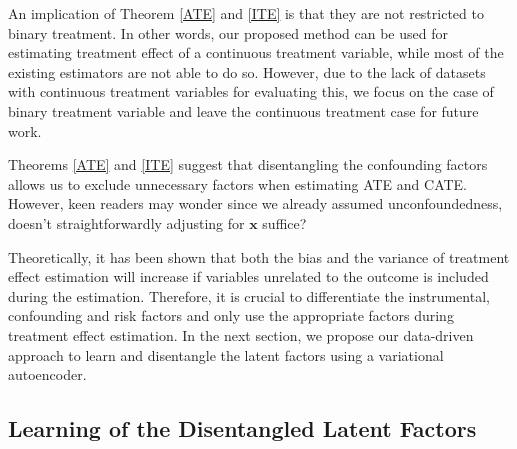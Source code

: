 \documentclass[letterpaper]{article} %
\newtheorem{theorem}{Theorem}
\begin{document}
An implication of Theorem \ref{ATE} and \ref{ITE} is that they are not restricted to binary treatment. In other words, our proposed method can be used for estimating treatment effect of a continuous treatment variable, while most of the existing estimators are not able to do so. However, due to the lack of datasets with continuous treatment variables for evaluating this, we focus on the case of binary treatment variable and leave the continuous treatment case for future work.

Theorems \ref{ATE} and \ref{ITE} suggest that disentangling the confounding factors allows us to exclude unnecessary factors when estimating ATE and CATE. However, keen readers may wonder since we already assumed unconfoundedness, doesn't straightforwardly adjusting for $\mathbf{x}$ suffice?

Theoretically, it has been shown that both the bias \cite{Abadie2006} and the variance \cite{Hahn1998} of treatment effect estimation will increase if variables unrelated to the outcome is included during the estimation. Therefore, it is crucial to differentiate the instrumental, confounding and risk factors and only use the appropriate factors during treatment effect estimation.
In the next section, we propose our data-driven approach to learn and disentangle the latent factors using a variational autoencoder.


\subsection*{Learning of the Disentangled Latent Factors}
\end{document}
